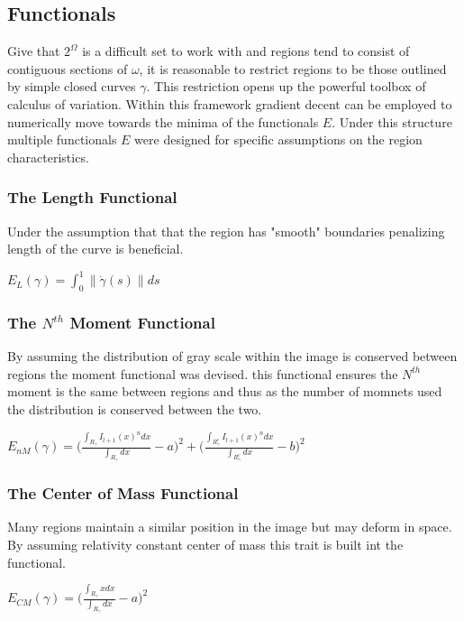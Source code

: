 \documentclass{article}
\begin{document}
		\subsection{Functionals}
			Give that $2^\Omega$ is a difficult set to work with and regions tend to consist of contiguous sections of $\omega$, it is reasonable to restrict regions to be those outlined by simple closed curves $\gamma$. This restriction opens up the powerful toolbox of calculus of variation. Within this framework gradient decent can be employed to numerically move towards the minima of the functionals $E$. Under this structure multiple functionals $E$ were designed for specific assumptions on the region characteristics.


			\subsubsection{The Length Functional}
				Under the assumption that that the region has "smooth" boundaries penalizing length of the curve is beneficial. 
				\begin{center}
					$E_L(\gamma) = \int_{0}^1{\|\dot\gamma(s)\|ds}$
				\end{center}

			\subsubsection{The $N^{th}$ Moment Functional}
				By assuming the distribution of gray scale within the image is conserved between regions the moment functional was devised. this functional ensures the $N^{th}$ moment is the same between regions and thus as the number of momnets used the distribution is conserved between the two.
				\begin{center}
				$E_{nM}(\gamma) = \Bigg(\frac{\int_{R_\gamma}{I_{l+1}(x)^n dx}}{\int_{R_\gamma}{dx}} - a\Bigg)^2 + \Bigg(\frac{\int_{R^{c}_\gamma}{I_{l+1}(x)^n dx}}{\int_{R^{c}_\gamma}{dx}} - b\Bigg)^2$ 
				\end{center}
			\subsubsection{The Center of Mass Functional}
				Many regions maintain a similar position in the image but may deform in space. By assuming relativity constant center of mass this trait is built int the functional.
				\begin{center}
					$E_{CM}(\gamma) = \Bigg(\frac{\int_{R_\gamma}{x dx}}{\int_{R_\gamma}{dx}} - a\Bigg)^2$ 
				\end{center}
\end{document}
